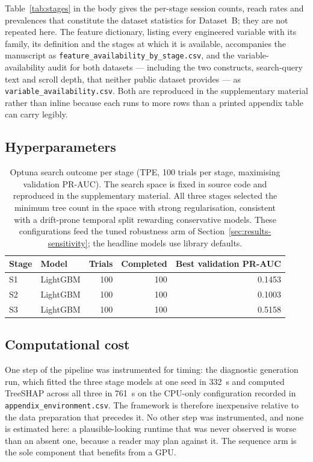 \documentclass[a4paper]{article}
\begin{document}
Table~\ref{tab:stages} in the body gives the per-stage session counts, reach
rates and prevalences that constitute the dataset statistics for Dataset~B;
they are not repeated here. The feature dictionary, listing every engineered
variable with its family, its definition and the stages at which it is
available, accompanies the manuscript as
\texttt{feature\_availability\_by\_stage.csv}, and the variable-availability
audit for both datasets --- including the two constructs, search-query text
and scroll depth, that neither public dataset provides --- as
\texttt{variable\_availability.csv}. Both are reproduced in the supplementary
material rather than inline because each runs to more rows than a printed
appendix table can carry legibly.

\subsection{Hyperparameters}

\begin{table}[htbp]
\centering
\caption{Optuna search outcome per stage (TPE, 100 trials per stage,
maximising validation PR-AUC). The search space is fixed in source code and
reproduced in the supplementary material. All three stages selected the
minimum tree count in the space with strong regularisation, consistent with a
drift-prone temporal split rewarding conservative models. These
configurations feed the tuned robustness arm of
Section~\ref{sec:results-sensitivity}; the headline models use library
defaults.}
\label{tab:a-hyperparameters}
\small
\begin{tabular}{@{}llrrr@{}}
\toprule
\textbf{Stage} & \textbf{Model} & \textbf{Trials} & \textbf{Completed} &
\textbf{Best validation PR-AUC} \\
\midrule
S1 & LightGBM & 100 & 100 & 0.1453 \\
S2 & LightGBM & 100 & 100 & 0.1003 \\
S3 & LightGBM & 100 & 100 & 0.5158 \\
\bottomrule
\end{tabular}
\end{table}

\subsection{Computational cost}

One step of the pipeline was instrumented for timing: the diagnostic
generation run, which fitted the three stage models at one seed in
\SI{332}{\second} and computed TreeSHAP across all three in
\SI{761}{\second} on the CPU-only configuration recorded in
\texttt{appendix\_environment.csv}. The framework is therefore inexpensive
relative to the data preparation that precedes it. No other step was
instrumented, and none is estimated here: a plausible-looking runtime that was
never observed is worse than an absent one, because a reader may plan against
it. The sequence arm is the sole component that benefits from a GPU.
\end{document}
